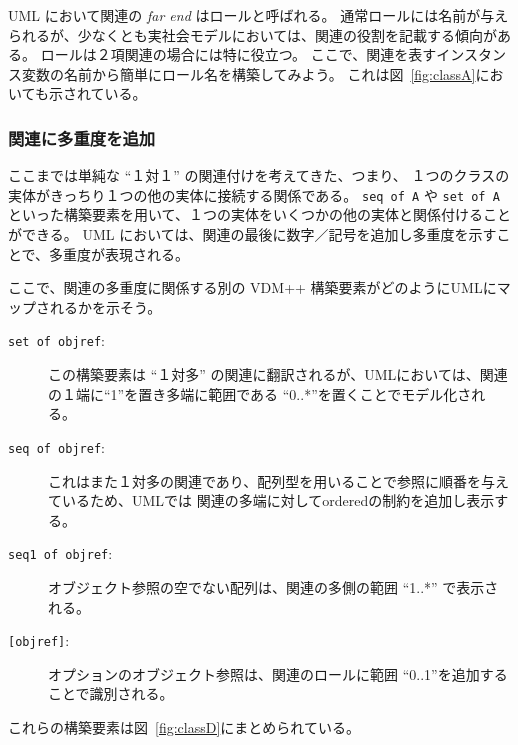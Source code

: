 \documentclass[\pformat,12pt]{jarticle}
\newcommand{\vdmpp}{VDM++}
\begin{document}
\renewcommand{\textfraction}{0}
                              

\renewcommand{\topfraction}{1}
                              

\setcounter{totalnumber}{100} 
\setcounter{topnumber}{100} 
   
UML において関連の {\it far end} はロールと呼ばれる。
通常ロールには名前が与えられるが、少なくとも実社会モデルにおいては、関連の役割を記載する傾向がある。
ロールは２項関連の場合には特に役立つ。
ここで、関連を表すインスタンス変数の名前から簡単にロール名を構築してみよう。
これは図~\ref{fig:classA}においても示されている。

\subsubsection*{関連に多重度を追加}
  
ここまでは単純な ``１対１'' の関連付けを考えてきた、つまり、 １つのクラスの実体がきっちり１つの他の実体に接続する関係である。
 {\tt seq of A} や {\tt set of A}といった構築要素を用いて、１つの実体をいくつかの他の実体と関係付けることができる。
 UML においては、関連の最後に数字／記号を追加し多重度を示すことで、多重度が表現される。

ここで、関連の多重度に関係する別の \vdmpp{} 構築要素がどのようにUMLにマップされるかを示そう。

\begin{description}
\item [{\tt set of objref}:]  この構築要素は ``１対多'' の関連に翻訳されるが、UMLにおいては、関連の１端に``1''を置き多端に範囲である ``0..*''を置くことでモデル化される。
\item [{\tt seq of objref}:]  これはまた１対多の関連であり、配列型を用いることで参照に順番を与えているため、UMLでは 関連の多端に対して{ordered}の制約を追加し表示する。
\item [{\tt seq1 of objref}:]  オブジェクト参照の空でない配列は、関連の多側の範囲 ``1..*'' で表示される。  
\item [{\tt [objref]}:]  オプションのオブジェクト参照は、関連のロールに範囲 ``0..1''を追加することで識別される。
\end{description}

これらの構築要素は図~\ref{fig:classD}にまとめられている。
\end{document}
